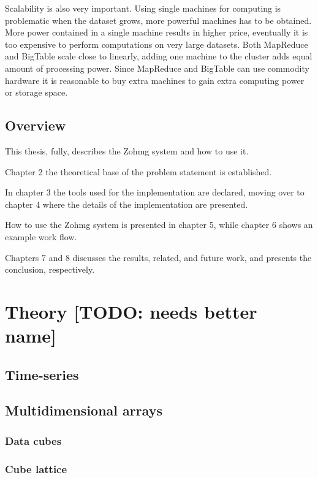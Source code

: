 \documentclass[a4paper,10pt]{book}
\begin{document}
Scalability is also very important. Using single machines for computing is
problematic when the dataset grows, more powerful machines has to be
obtained. More power contained in a single machine results in higher price,
eventually it is too expensive to perform computations on very large
datasets. Both MapReduce and BigTable scale close to linearly, adding one
machine to the cluster adds equal amount of processing power. Since
MapReduce and BigTable can use commodity hardware it is reasonable to buy
extra machines to gain extra computing power or storage space.


\section{Overview}

This thesis, fully, describes the Zohmg system and how to use it.

Chapter 2 the theoretical base of the problem statement is established.

In chapter 3 the tools used for the implementation are declared, moving
over to chapter 4 where the details of the implementation are presented.

How to use the Zohmg system is presented in chapter 5, while chapter 6
shows an example work flow.

Chapters 7 and 8 discusses the results, related, and future work, and
presents the conclusion, respectively.



\chapter{Theory [TODO: needs better name]}

\section{Time-series}

\section{Multidimensional arrays}

\subsection{Data cubes}

\subsection{Cube lattice}
\end{document}

